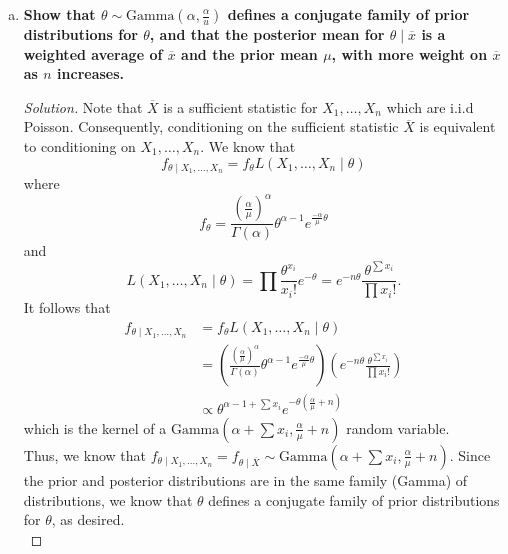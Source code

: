 \documentclass[11pt]{article}
\newenvironment{solution}
  {\renewcommand\qedsymbol{$\blacksquare$}\begin{proof}[Solution]}
  {\end{proof}}
\begin{document}
\begin{enumerate}
\begin{enumerate}[a)]
        
        \item \textbf{Show that $\theta \sim \mathrm{Gamma}\left( \alpha, \frac{\alpha}{u} \right)$ defines a conjugate family of prior distributions for $\theta$, and that the
        posterior mean for $\theta \mid \overline{x}$ is a weighted average of $\overline{x}$ and the prior mean $\mu$, with more weight on $\overline{x}$ as $n$ increases.}

        \begin{solution}
        Note that $\overline{X}$ is a sufficient statistic for $X_1, \dots, X_n$ which are i.i.d\, Poisson. Consequently, 
        conditioning on the sufficient statistic $\overline{X}$ is equivalent to conditioning on $X_1, \dots, X_n$. We know that
        \[
            f_{\theta \mid X_1, \dots, X_n} = f_{\theta}L(X_1, \dots, X_n \mid \theta)
        \]
        where 
        \[
            f_{\theta} = \frac{\left( \frac{\alpha}{\mu} \right)^\alpha }{\Gamma(\alpha)} \theta^{\alpha - 1} e^{\frac{-\alpha}{\mu} \theta}
        \]
        and
        \[
            L(X_1, \dots, X_n \mid \theta) = \prod \frac{\theta^{x_i}}{x_i!}e^{-\theta} = e^{-n\theta} \frac{\theta^{\sum x_i}}{\prod x_i!}.
        \]
        It follows that 
        \begin{align*}
            f_{\theta \mid X_1, \dots, X_n} &= f_{\theta}L(X_1, \dots, X_n \mid \theta) \\
            &= \left( \frac{\left( \frac{\alpha}{\mu} \right)^\alpha }{\Gamma(\alpha)} \theta^{\alpha - 1} e^{\frac{-\alpha}{\mu} \theta} \right) \left( e^{-n\theta} \frac{\theta^{\sum x_i}}{\prod x_i!} \right) \\
            &\propto \theta^{\alpha - 1 + \sum x_i} e^{-\theta\left( \frac{\alpha}{\mu} + n \right) }
        \end{align*}
        which is the kernel of a $\mathrm{Gamma}\left(\alpha + \sum x_i, \frac{\alpha}{\mu} + n\right)$ random variable. \\

        Thus, we know that $f_{\theta \mid X_1, \dots, X_n} = f_{\theta \mid \overline{X}} \sim \mathrm{Gamma}\left(\alpha + \sum x_i, \frac{\alpha}{\mu} + n\right)$. Since the prior and posterior
        distributions are in the same family (Gamma) of distributions, we know that $\theta$ defines a conjugate family of prior distributions for $\theta$, as desired. \\


\end{solution}
\end{enumerate}
\end{enumerate}
\end{document}
